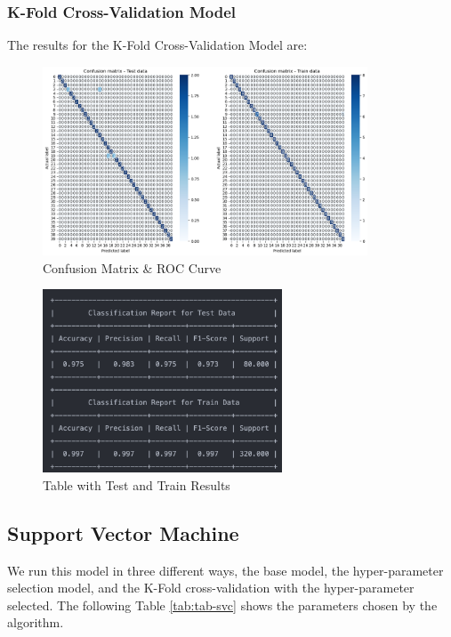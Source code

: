 \documentclass[conference]{IEEEtran}
\begin{document}
\subsubsection{K-Fold Cross-Validation Model}

The results for the K-Fold Cross-Validation Model are:

\begin{figure}[!h!]
    \includegraphics[width=3.8in]{GNB/3.png}%
    \caption{Confusion Matrix & ROC Curve}%
    \label{fig:conf_gnb_3}%
\end{figure}

\begin{figure}[!h!]
    \includegraphics[width=2.8in]{GNB/r_3.png}%
    \caption{Table with Test and Train Results}%
    \label{fig:conf_gnb_r_3}%
\end{figure}



\subsection{Support Vector Machine}

We run this model in three different ways, the base model, the hyper-parameter selection model, and the K-Fold cross-validation with the hyper-parameter selected. The following Table \ref{tab:tab-svc} shows the parameters chosen by the algorithm.
\end{document}
